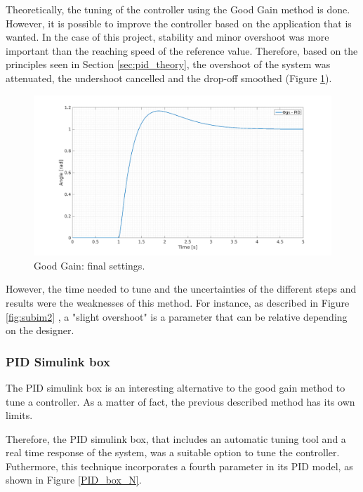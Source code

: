 \vspace{5mm}

Theoretically, the tuning of the controller using the Good Gain method is done. However, it is possible to improve the controller based on the application that is wanted. In the case of this project, stability and minor overshoot was more important than the reaching speed of the reference value. Therefore, based on the principles seen in Section \ref{sec:pid_theory}, the overshoot of the system was attenuated, the undershoot cancelled and the drop-off smoothed (Figure \ref{finalGG}).

\begin{figure}[H]
  \centerline{
  \includegraphics[scale=0.35]{figures/GG5.png}}
  \caption[LABEL] {Good Gain: final settings.}
  \label{finalGG}
\end{figure}

However, the time needed to tune and the uncertainties of the different steps and results were the weaknesses of this method. For instance, as described in Figure \ref{fig:subim2} , a "slight overshoot" is a parameter that can be relative depending on the designer.\par  
  
\subsubsection{PID Simulink box}
The PID simulink box is an interesting alternative to the good gain method to tune a controller. As a matter of fact, the previous described method has its own limits.\par 
  
Therefore, the PID simulink box, that includes an automatic tuning tool and a real time response of the system, was a suitable option to tune the controller. Futhermore, this technique incorporates a fourth parameter in its PID model, as shown in Figure \ref{PID_box_N}. 
 

